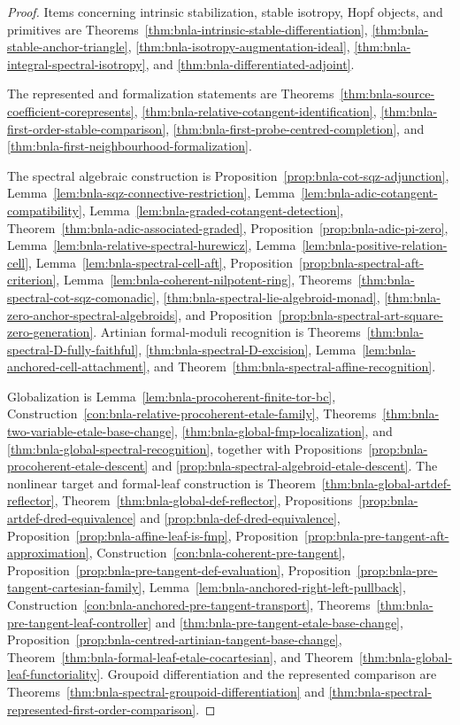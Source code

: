 \begin{proof}
Items concerning intrinsic stabilization, stable isotropy, Hopf objects, and
primitives are
Theorems~\ref{thm:bnla-intrinsic-stable-differentiation},
\ref{thm:bnla-stable-anchor-triangle},
\ref{thm:bnla-isotropy-augmentation-ideal},
\ref{thm:bnla-integral-spectral-isotropy}, and
\ref{thm:bnla-differentiated-adjoint}.

The represented and formalization statements are
Theorems~\ref{thm:bnla-source-coefficient-corepresents},
\ref{thm:bnla-relative-cotangent-identification},
\ref{thm:bnla-first-order-stable-comparison},
\ref{thm:bnla-first-probe-centred-completion}, and
\ref{thm:bnla-first-neighbourhood-formalization}.

The spectral algebraic construction is
Proposition~\ref{prop:bnla-cot-sqz-adjunction},
Lemma~\ref{lem:bnla-sqz-connective-restriction},
Lemma~\ref{lem:bnla-adic-cotangent-compatibility},
Lemma~\ref{lem:bnla-graded-cotangent-detection},
Theorem~\ref{thm:bnla-adic-associated-graded},
Proposition~\ref{prop:bnla-adic-pi-zero},
Lemma~\ref{lem:bnla-relative-spectral-hurewicz},
Lemma~\ref{lem:bnla-positive-relation-cell},
Lemma~\ref{lem:bnla-spectral-cell-aft},
Proposition~\ref{prop:bnla-spectral-aft-criterion},
Lemma~\ref{lem:bnla-coherent-nilpotent-ring},
Theorems~\ref{thm:bnla-spectral-cot-sqz-comonadic},
\ref{thm:bnla-spectral-lie-algebroid-monad},
\ref{thm:bnla-zero-anchor-spectral-algebroids},
and Proposition~\ref{prop:bnla-spectral-art-square-zero-generation}.
Artinian formal-moduli recognition is
Theorems~\ref{thm:bnla-spectral-D-fully-faithful},
\ref{thm:bnla-spectral-D-excision},
Lemma~\ref{lem:bnla-anchored-cell-attachment}, and
Theorem~\ref{thm:bnla-spectral-affine-recognition}.

Globalization is
Lemma~\ref{lem:bnla-procoherent-finite-tor-bc},
Construction~\ref{con:bnla-relative-procoherent-etale-family},
Theorems~\ref{thm:bnla-two-variable-etale-base-change},
\ref{thm:bnla-global-fmp-localization}, and
\ref{thm:bnla-global-spectral-recognition}, together with
Propositions~\ref{prop:bnla-procoherent-etale-descent} and
\ref{prop:bnla-spectral-algebroid-etale-descent}.  The nonlinear target and
formal-leaf construction is
Theorem~\ref{thm:bnla-global-artdef-reflector},
Theorem~\ref{thm:bnla-global-def-reflector},
Propositions~\ref{prop:bnla-artdef-dred-equivalence} and
\ref{prop:bnla-def-dred-equivalence},
Proposition~\ref{prop:bnla-affine-leaf-is-fmp},
Proposition~\ref{prop:bnla-pre-tangent-aft-approximation},
Construction~\ref{con:bnla-coherent-pre-tangent},
Proposition~\ref{prop:bnla-pre-tangent-def-evaluation},
Proposition~\ref{prop:bnla-pre-tangent-cartesian-family},
Lemma~\ref{lem:bnla-anchored-right-left-pullback},
Construction~\ref{con:bnla-anchored-pre-tangent-transport},
Theorems~\ref{thm:bnla-pre-tangent-leaf-controller} and
\ref{thm:bnla-pre-tangent-etale-base-change},
Proposition~\ref{prop:bnla-centred-artinian-tangent-base-change},
Theorem~\ref{thm:bnla-formal-leaf-etale-cocartesian}, and
Theorem~\ref{thm:bnla-global-leaf-functoriality}.  Groupoid differentiation and the
represented comparison are
Theorems~\ref{thm:bnla-spectral-groupoid-differentiation} and
\ref{thm:bnla-spectral-represented-first-order-comparison}.


\end{proof}
